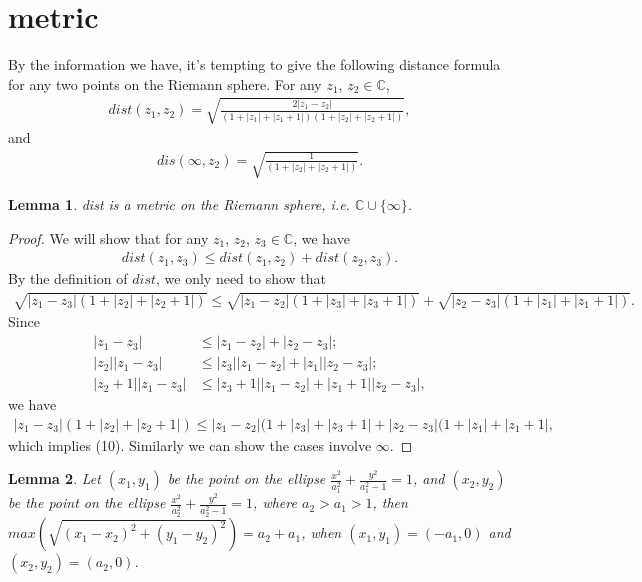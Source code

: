 \documentclass{amsart}
\newcommand{\C}{\mathbb C} %
\newtheorem{lemma}{Lemma}[section]
\begin{document}
\section{metric}
By the information we have, it's tempting to give the following distance formula for any two points on the Riemann sphere.
For any $z_1$, $z_2 \in \C$,
\begin{align*}
dist(z_1, z_2) = \sqrt{\frac{2|z_1 - z_2|}{(1+|z_1|+|z_1 +1|)(1+|z_2|+|z_2 +1|)}},
\end{align*}
and
\begin{align*}
dis(\infty, z_2) = \sqrt{\frac{1}{(1+|z_2|+|z_2 +1|)}}.
\end{align*}

\begin{lemma}
dist is a metric on the Riemann sphere, i.e. $\C \cup \{\infty \}$.
\end{lemma}

\begin{proof}
We will show that for any $z_1$, $z_2$, $z_3 \in \C$, we have
\begin{align*}
dist(z_1 , z_3) \leq dist(z_1, z_2) + dist(z_2, z_3).
\end{align*}
By the definition of $dist$, we only need to show that
\begin{align}
\sqrt{|z_1 - z_3|(1 + |z_2| + |z_2 + 1|)} \leq \sqrt{|z_1 - z_2|(1 + |z_3| + |z_3 + 1|)}+ \sqrt{|z_2 - z_3|(1 + |z_1| + |z_1 + 1|)}.
\end{align}
Since
\begin{align*}
|z_1 - z_3| &\leq |z_1 - z_2| + |z_2 - z_3|; \\
|z_2||z_1 - z_3| &\leq |z_3||z_1 - z_2| + |z_1||z_2 - z_3|;\\
|z_2 + 1||z_1 - z_3| &\leq |z_3 + 1||z_1 - z_2| + |z_1 + 1||z_2 - z_3|,
\end{align*}
we have
\begin{align*}
|z_1 - z_3|(1 + |z_2| + |z_2 + 1|) \leq |z_1 - z_2|(1 + |z_3| + |z_3 + 1| + |z_2 - z_3|(1 + |z_1| + |z_1 + 1|,
\end{align*}
which implies (10).
Similarly we can show the cases involve $\infty$.
\end{proof}

\begin{lemma}
Let $(x_1, y_1)$ be the point on the ellipse $\frac{x^2}{a_{1}^{2}} + \frac{y^2}{a_{1}^2 - 1} = 1$, and
$(x_2, y_2)$ be the point on the ellipse $\frac{x^2}{a_{2}^{2}} + \frac{y^2}{a_{2}^2 - 1} = 1$, where $a_2 > a_1 > 1$,
then $max(\sqrt{(x_1 - x_2)^2 + (y_1 - y_2)^2}) = a_2 + a_1$, when $(x_1, y_1) = (-a_1, 0)$ and $(x_2, y_2) = (a_2, 0)$.
\end{lemma}
\end{document}

